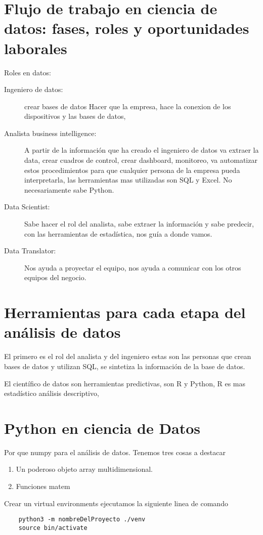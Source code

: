 \section{Flujo de trabajo en ciencia de datos: fases, roles y oportunidades laborales} 

Roles en datos: 

\begin{description}
	\item[Ingeniero de datos: ] crear bases de datos  Hacer que la empresa, hace la conexion de los dispositivos y las bases de datos,
	
	\item[Analista business intelligence: ] A partir de la informaci\'on que ha creado el ingeniero de datos va extraer la data, crear cuadros de control, crear dashboard, monitoreo, va automatizar estos procedimientos para que cualquier persona de la empresa pueda interpretarla, las herramientas mas utilizadas son SQL y Excel. No necesariamente sabe Python.
	
	\item[Data Scientist: ] Sabe hacer el rol del analista, sabe extraer la informaci\'on y sabe predecir, con las herramientas de estad\'istica, nos gu\'ia a donde vamos. 
	
	\item[Data Translator: ] Nos ayuda a proyectar el equipo, nos ayuda a comunicar con los otros equipos del negocio. 
	
	
\end{description}

\section{Herramientas para cada etapa del an\'alisis de datos}

El primero es el rol del analista y del ingeniero estas son las personas que crean bases de datos y utilizan SQL, se sintetiza la informaci\'on de la base de datos. 

El cient\'ifico de datos son herramientas predictivas, son R y Python, R es mas estad\'istico an\'alisis descriptivo, 

\section{Python en ciencia de Datos}

Por que numpy para el análisis de datos. Tenemos tres cosas a destacar 
\begin{enumerate}
	\item Un poderoso objeto array multidimensional.
	\item Funciones matem
\end{enumerate}

Crear un virtual environments ejecutamos la siguiente linea de comando

\begin{verbatim}
	python3 -m nombreDelProyecto ./venv
	source bin/activate
\end{verbatim}



